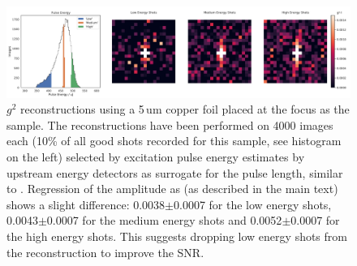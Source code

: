 \begin{figure}[h!]
	\centering
	\includegraphics[width=\linewidth]{images/energy_binned.pdf}
	\caption[Excitation energy binned reconstruction]{$g^2$ reconstructions using a 5\,um copper foil placed at the focus as the sample. The reconstructions have been performed on 4000 images each (10\% of all good shots recorded for this sample, see histogram on the left)  selected by excitation pulse energy estimates by upstream energy detectors as surrogate for the pulse length, similar to \cite{inoue2019}. Regression of the amplitude as (as described in the main text) shows a slight difference: 0.0038$\pm$0.0007 for the low energy shots, 0.0043$\pm$0.0007 for the medium energy shots and 0.0052$\pm$0.0007 for the high energy shots. This suggests dropping low energy shots from the reconstruction to improve the SNR.}
	\label{fig:energy_binned}
\end{figure}


